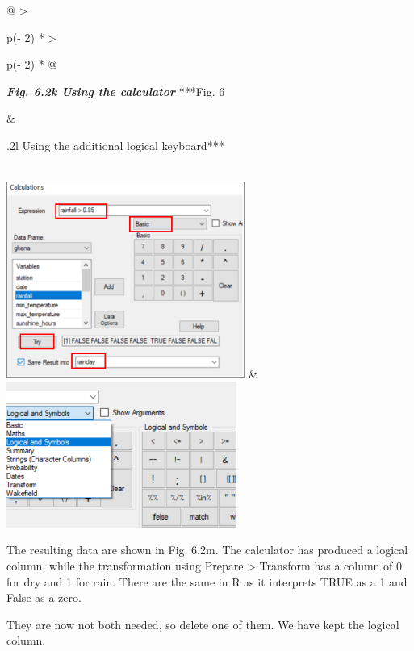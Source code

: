 \documentclass[
  letterpaper,
  DIV=11,
  numbers=noendperiod]{scrreprt}
\begin{document}
\begin{longtable}[]{@{}
  >{\raggedright\arraybackslash}p{(\columnwidth - 2\tabcolsep) * }
  >{\raggedright\arraybackslash}p{(\columnwidth - 2\tabcolsep) * }@{}}
\toprule\noalign{}
\begin{minipage}[b]{\linewidth}\raggedright
\textbf{\emph{Fig. 6.2k Using the calculator}} ***Fig. 6
\end{minipage} & \begin{minipage}[b]{\linewidth}\raggedright
.2l Using the additional logical keyboard***
\end{minipage} \\
\midrule\noalign{}
\endhead
\bottomrule\noalign{}
\endlastfoot
\includegraphics[width=3.07775in,height=2.54694in]{figures/Fig6.2k.png}
&
\includegraphics[width=2.96863in,height=1.87995in]{figures/Fig6.2l.png} \\
\end{longtable}

The resulting data are shown in Fig. 6.2m. The calculator has produced a
logical column, while the transformation using Prepare \textgreater{}
Transform has a column of 0 for dry and 1 for rain. There are the same
in R as it interprets TRUE as a 1 and False as a zero.

They are now not both needed, so delete one of them. We have kept the
logical column.
\end{document}
